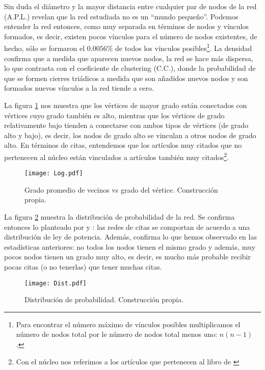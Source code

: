 \documentclass[12pt,letter]{article}
\begin{document}
Sin duda el diámetro y la mayor distancia entre cualquier par de nodos de la red (A.P.L.) revelan que la red estudiada no es un ``mundo pequeño''. Podemos entender la red entonces, como muy separada en términos de nodos y vínculos formados, es decir, existen pocos vínculos para el número de nodos existentes, de hecho, sólo se formaron el $0.0056\%$ de todos los vínculos posibles\footnote{Para encontrar el número máximo de vínculos posibles multiplicamos el número de nodos total por le número de nodos total menos uno: $n(n-1)$ \citep{Newman6}.}. La densidad confirma que a medida que aparecen nuevos nodos, la red se hace más dispersa, lo que contrasta con el coeficiente de clustering (C.C.), donde la probabilidad de que se formen cierres triádicos a medida que son añadidos nuevos nodos y son formados nuevos vínculos a la red tiende a cero.

\vspace{0.5cm}

La figura \ref{f7} nos muestra que los vértices de mayor grado están conectados con vértices cuyo grado también es alto, mientras que los vértices de grado relativamente bajo tienden a conectarse con ambos tipos de vértices (de grado alto y bajo), es decir, los nodos de grado alto se vinculan a otros nodos de grado alto. En términos de citas, entendemos que los artículos muy citados que no pertenecen al núcleo están vinculados a artículos también muy citados\footnote{Con el núcleo nos referimos a los artículos que pertenecen al libro de \citep{Lucas2}}.

\begin{figure}[h!]
\centering
\texttt{[image: Log.pdf]}
\caption{\small{Grado promedio de vecinos vs grado del vértice. Construcción propia.}} 
\label{f7}
\end{figure}

La figura \ref{f8} muestra la distribución de probabilidad de la red. Se confirma entonces lo planteado por \cite{SollaPrice} y \cite{Albert}: las redes de citas se comportan de acuerdo a una distribución de ley de potencia. Además, confirma lo que hemos observado en las estadísticas anteriores: no todos los nodos tienen el mismo grado y además, muy pocos nodos tienen un grado muy alto, es decir, es mucho más probable recibir pocas citas (o no tenerlas) que tener muchas citas.



\begin{figure}[h!]
\centering
\texttt{[image: Dist.pdf]}
\caption{\small{Distribución de probabilidad. Construcción propia.}} 
\label{f8}
\end{figure}
\end{document}
